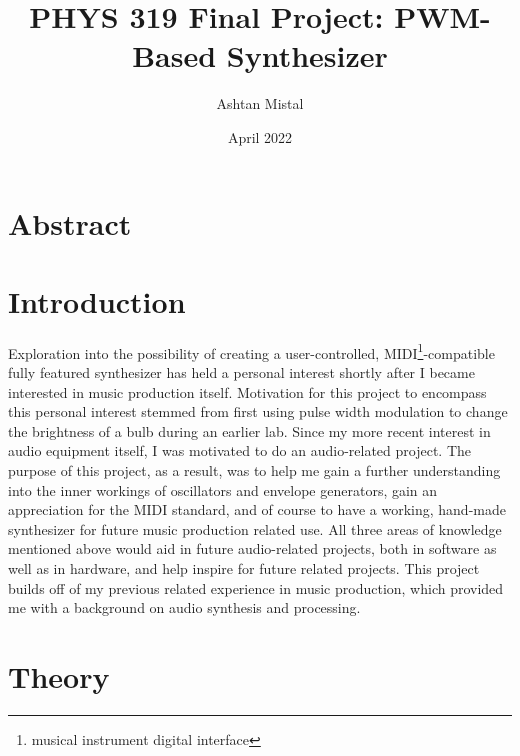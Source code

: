 \documentclass[10pt]{article}
\title{PHYS 319 Final Project: PWM-Based Synthesizer}
\author{Ashtan Mistal}
\date{April 2022}
\begin{document}
\maketitle

\break

\tableofcontents{}

\break

\section{Abstract}


\section{Introduction}

Exploration into the possibility of creating a user-controlled, MIDI\footnote{musical instrument digital interface}-compatible fully featured synthesizer has held a personal interest shortly after I became interested in music production itself. Motivation for this project to encompass this personal interest stemmed from first using pulse width modulation to change the brightness of a bulb during an earlier lab. Since my more recent interest in audio equipment itself, I was motivated to do an audio-related project. The purpose of this project, as a result, was to help me gain a further understanding into the inner workings of oscillators and envelope generators, gain an appreciation for the MIDI standard, and of course to have a working, hand-made synthesizer for future music production related use. All three areas of knowledge mentioned above would aid in future audio-related projects, both in software as well as in hardware, and help inspire for future related projects. This project builds off of my previous related experience in music production, which provided me with a background on audio synthesis and processing. 

\section{Theory}

\end{document}
